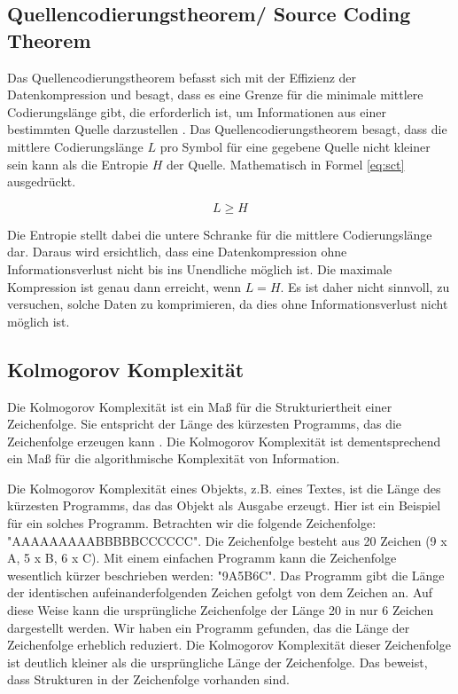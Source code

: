 \documentclass[conference]{IEEEtran}
\begin{document}
\subsection{Quellencodierungstheorem/ Source Coding Theorem}

Das Quellencodierungstheorem befasst sich mit der Effizienz der Datenkompression 
und besagt, dass es eine Grenze für die minimale mittlere Codierungslänge gibt, 
die erforderlich ist, um Informationen aus einer bestimmten Quelle 
darzustellen \cite{sharma}. 
Das Quellencodierungstheorem besagt, dass die mittlere Codierungslänge $L$ pro Symbol
für eine gegebene Quelle nicht kleiner sein kann als die Entropie $H$ der Quelle.
Mathematisch in Formel \ref{eq:sct} ausgedrückt.

\begin{equation}
  \label{eq:sct}
  L \ge H
\end{equation}

Die Entropie stellt dabei die untere Schranke für die mittlere Codierungslänge dar.
Daraus wird ersichtlich, dass eine Datenkompression ohne Informationsverlust 
nicht bis ins Unendliche möglich ist. 
Die maximale Kompression ist genau dann erreicht, wenn $L = H$.
Es ist daher nicht sinnvoll, zu versuchen, solche Daten zu komprimieren, da 
dies ohne Informationsverlust nicht möglich ist.


\subsection{Kolmogorov Komplexität}

Die Kolmogorov Komplexität ist ein Maß für die Strukturiertheit einer Zeichenfolge.
Sie entspricht der Länge des kürzesten Programms, das die Zeichenfolge 
erzeugen kann \cite{li}. 
Die Kolmogorov Komplexität ist dementsprechend ein Maß für die algorithmische Komplexität
von Information.

Die Kolmogorov Komplexität eines Objekts, z.B. eines Textes, ist die Länge des kürzesten 
Programms, das das Objekt als Ausgabe erzeugt. 
Hier ist ein Beispiel für ein solches Programm. 
Betrachten wir die folgende Zeichenfolge: "AAAAAAAAABBBBBCCCCCC". 
Die Zeichenfolge besteht aus 20 Zeichen (9 x A, 5 x B, 6 x C). 
Mit einem einfachen Programm kann die Zeichenfolge wesentlich kürzer beschrieben 
werden: "9A5B6C". 
Das Programm gibt die Länge der identischen aufeinanderfolgenden Zeichen 
gefolgt von dem Zeichen an. 
Auf diese Weise kann die ursprüngliche Zeichenfolge der Länge 20 in nur 6 
Zeichen dargestellt werden. 
Wir haben ein Programm gefunden, das die Länge der Zeichenfolge erheblich reduziert. 
Die Kolmogorov Komplexität dieser Zeichenfolge ist deutlich kleiner als die 
ursprüngliche Länge der Zeichenfolge. 
Das beweist, dass Strukturen in der Zeichenfolge vorhanden sind.
\end{document}
